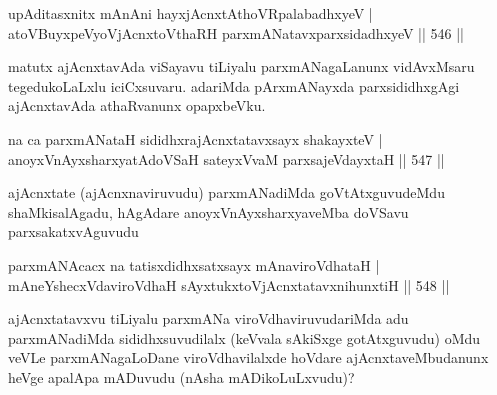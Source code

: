 \begin{shl}
upAditasxnitx mAnAni hayxjAcnxtAthoVRpalabadhxyeV | \\
atoV\s BuyxpeVyoV\s jAcnxtoV\s thaRH parxmANatavxparxsidadhxyeV \hfill||  546 ||  
\end{shl}

\begin{artha}
matutx ajAcnxtavAda viSayavu tiLiyalu parxmANagaLanunx vidAvxMsaru tegedukoLaLxlu iciCxsuvaru. adariMda pArxmANayxda parxsididhxgAgi ajAcnxtavAda athaRvanunx opapxbeVku.
\end{artha}


\begin{shl}
na ca parxmANataH sididhxrajAcnxtatavxsayx shakayxteV | \\
anoyxVnAyxsharxyatAdoVSaH sateyxVvaM parxsajeVdayxtaH \hfill||  547 ||  
\end{shl}

\begin{artha}
ajAcnxtate (ajAcnxnaviruvudu) parxmANadiMda goVtAtxguvudeMdu shaMkisalAgadu, hAgAdare anoyxVnAyxsharxyaveMba doVSavu parxsakatxvAguvudu
\end{artha}


\begin{shl}
parxmANAcacx na tatisxdidhxsatxsayx mAnaviroVdhataH | \\
mAneYshecxVdaviroVdhaH sAyxtukxtoV\s jAcnxtatavxnihunxtiH \hfill||  548 ||  
\end{shl}

\begin{artha}
ajAcnxtatavxvu tiLiyalu parxmANa viroVdhaviruvudariMda adu parxmANadiMda sididhxsuvudilalx (keVvala sAkiSxge gotAtxguvudu) oMdu veVLe parxmANagaLoDane viroVdhavilalxde hoVdare ajAcnxtaveMbudanunx heVge apalApa mADuvudu (nAsha mADikoLuLxvudu)?
\end{artha}

